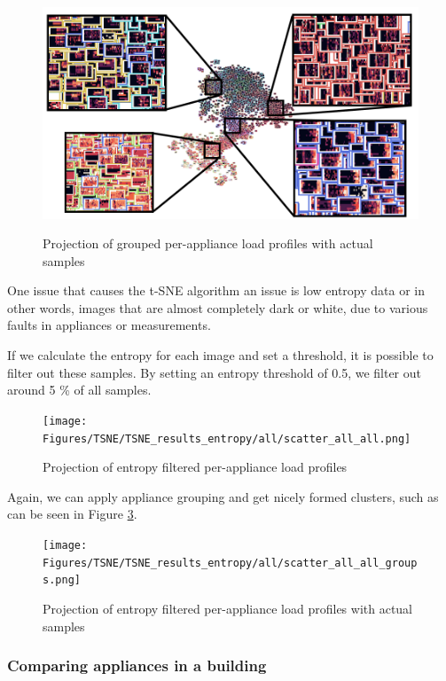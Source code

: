 \begin{figure}[H]
	\centering
	\caption{Projection of grouped per-appliance load profiles with actual samples}
	\includegraphics[width=.9\textwidth]{Figures/TSNE/TSNE_results/all/t-sne_zoomed.png}
	\label{fig:t-sne_zoomed}
\end{figure}

One issue that causes the t-SNE algorithm an issue is low entropy data or 
in other words, images that are almost completely dark or white, due to various faults in appliances or measurements.

If we calculate the entropy for each image and set a threshold, it is possible to filter out these samples. 
By setting an entropy threshold of 0.5, we filter out around 5 \% of all samples. 

\begin{figure}[H]
	\centering
	\caption{Projection of entropy filtered per-appliance load profiles}
	\texttt{[image: Figures/TSNE/TSNE\_results\_entropy/all/scatter\_all\_all.png]}
	\label{fig:tsne_papb_scatter_ent_all_groups}
\end{figure}

Again, we can apply appliance grouping and get nicely formed clusters, such as can be seen in Figure \ref{fig:tsne_papb_img_scatter_ent_all_groups}.

\begin{figure}[H]
	\centering
	\caption{Projection of entropy filtered per-appliance load profiles with actual samples}
	\texttt{[image: Figures/TSNE/TSNE\_results\_entropy/all/scatter\_all\_all\_groups.png]}
	\label{fig:tsne_papb_img_scatter_ent_all_groups}
\end{figure}


\subsubsection{Comparing appliances in a building}


